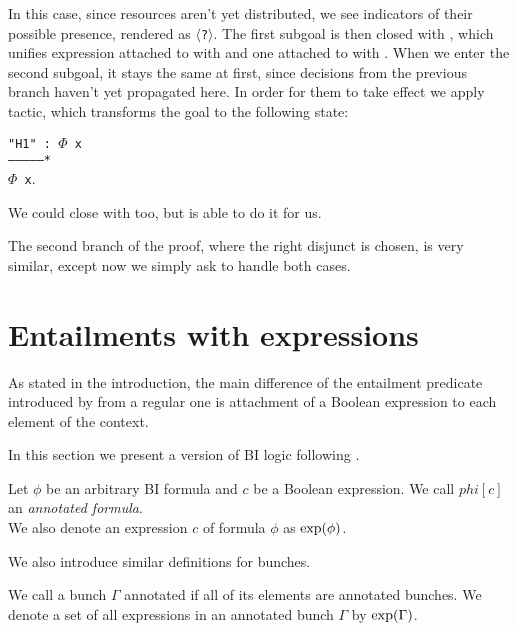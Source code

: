 In this case, since resources aren't yet distributed, we see indicators of their possible presence, rendered as \texttt{$\langle$?$\rangle$}.
The first subgoal is then closed with , which unifies expression attached to  with \true and one attached to  with \false.
When we enter the second subgoal, it stays the same at first, since decisions from the previous branch haven't yet propagated here.
In order for them to take effect we apply  tactic, which transforms the goal to the following state:
\begin{minipage}[t]{\linewidth}
\texttt{"H1" : $\Phi$ x\\
---------------*\\
$\Phi$ x}.
\end{minipage}

We could close with  too, but  is able to do it for us.

The second branch of the proof, where the right disjunct is chosen, is very similar, except now we simply ask  to handle both cases.

\section{Entailments with expressions}

As stated in the introduction, the main difference of the entailment predicate introduced by \cite{harlandResourceDistributionBooleanConstraints2003} from a regular one is attachment of a Boolean expression to each element of the context.

In this section we present a version of BI logic following \citet{harlandResourceDistributionBooleanConstraints2003}.

\begin{definition}
  Let \(\phi\) be an arbitrary BI formula and \(c\) be a Boolean expression.
  We call \(phi[c]\) an \emph{annotated formula}.\\
  We also denote an expression \(c\) of formula \(\phi\) as \(\text{exp}(\phi)\).
\end{definition}

We also introduce similar definitions for bunches.

\begin{definition}
  We call a bunch \(\Gamma\) annotated if all of its elements are annotated bunches.
  We denote a set of all expressions in an annotated bunch \(\Gamma\) by \(\text{exp}(\Gamma)\).
\end{definition}

